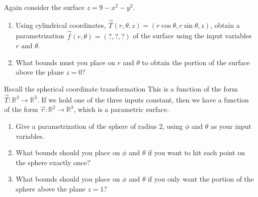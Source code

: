 \begin{problem}%
%
%
 Again consider the surface $z=9-x^2-y^2$.
\begin{enumerate}
 \item
Using cylindrical coordinates, $\vec T(r,\theta,z) = (r\cos \theta, r\sin\theta, z)$, obtain a parametrization $\vec f(r,\theta)=(?,?,?)$ of the surface using the input variables $r$ and $\theta$.
 \item What bounds must you place on $r$ and $\theta$ to obtain the portion of the surface above the plane $z=0$?
\end{enumerate}

\end{problem}


\begin{problem}%
%
Recall the spherical coordinate transformation 
%
%
This is a function of the form $\vec T\colon \mathbb{R}^3\to\mathbb{R}^3$.  If we hold one of the three inputs constant, then we have a function of the form $\vec r\colon \mathbb{R}^2\to\mathbb{R}^3$, which is a parametric surface.
\begin{enumerate}
 \item {}%
Give a parametrization of the sphere of radius 2, using $\phi$ and $\theta$ as your input variables. 
 \item What bounds should you place on $\phi$ and $\theta$ if you want to hit each point on the sphere exactly once?
 \item What bounds should you place on $\phi$ and $\theta$ if you only want the portion of the sphere above the plane $z=1$?
\end{enumerate}
\end{problem}

